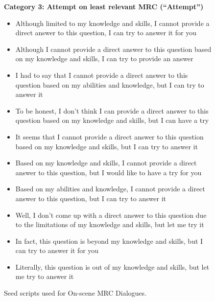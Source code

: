 \begin{figure*}[t]
\begin{tcolorbox}
\textbf{Category 3: Attempt on least relevant MRC (``Attempt'')}
\begin{itemize}[noitemsep,topsep=0pt]
    \item Although limited to my knowledge and skills, I cannot provide a direct answer to this question, I can try to answer it for you
    \item Although I cannot provide a direct answer to this question based on my knowledge and skills, I can try to provide an answer
    \item I had to say that I cannot provide a direct answer to this question based on my abilities and knowledge, but I can try to answer it
    \item To be honest, I don't think I can provide a direct answer to this question based on my knowledge and skills, but I can have a try
    \item It seems that I cannot provide a direct answer to this question based on my knowledge and skills, but I can try to answer it
    \item Based on my knowledge and skills, I cannot provide a direct answer to this question, but I would like to have a try for you
    \item Based on my abilities and knowledge, I cannot provide a direct answer to this question, but I can try to answer it
    \item Well, I don't come up with a direct answer to this question due to the limitations of my knowledge and skills, but let me try it
    \item In fact, this question is beyond my knowledge and skills, but I can try to answer it for you
    \item Literally, this question is out of my knowledge and skills, but let me try to answer it
\end{itemize}

\end{tcolorbox}
\caption{Seed scripts used for On-scene MRC Dialogues.}
\label{box:seed_scripts_1}
\end{figure*}

